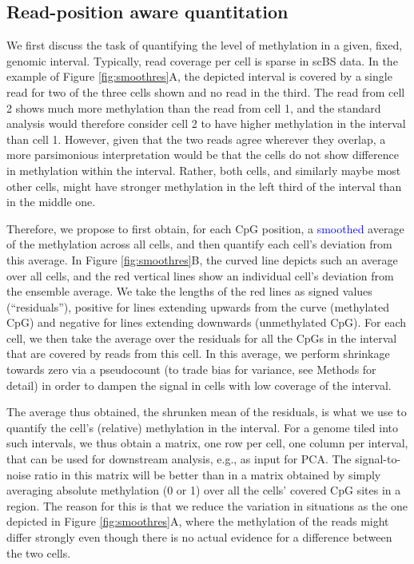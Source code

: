 \documentclass[twocolumn,10pt]{article}
\newcommand{\new}[1]{\textcolor{blue}{#1}}
\begin{document}
\subsection{Read-position aware quantitation} \label{residuals}

We first discuss the task of quantifying the level of methylation in a given, fixed, genomic interval.
Typically, read coverage per cell is sparse in scBS data.
In the example of Figure \ref{fig:smoothres}A, the depicted interval is covered by a single read for two of the three cells shown and no read in the third.
The read from cell 2 shows much more methylation than the read from cell 1, and the standard analysis would therefore consider cell 2 to have higher methylation in the interval than cell 1.
However, given that the two reads agree wherever they overlap, a more parsimonious interpretation would be that the cells do not show difference in methylation within the interval.
Rather, both cells, and similarly maybe most other cells, might have stronger methylation in the left third of the interval than in the middle one.

Therefore, we propose to first obtain, for each CpG position, a \new{smoothed} average of the methylation across all cells, and then quantify each cell's deviation from this average.
In Figure \ref{fig:smoothres}B, the curved line depicts such an average over all cells, and the red vertical lines show an individual cell's deviation from the ensemble average.
We take the lengths of the red lines as signed values (``residuals''), positive for lines extending upwards from the curve (methylated CpG) and negative for lines extending downwards (unmethylated CpG).
For each cell, we then take the average over the residuals for all the CpGs in the interval that are covered by reads from this cell.
In this average, we perform shrinkage towards zero via a pseudocount (to trade bias for variance, see Methods for detail) in order to dampen the signal in cells with low coverage of the interval.

The average thus obtained, the shrunken mean of the residuals, is what we use to quantify the cell's (relative) methylation in the interval.
For a genome tiled into such intervals, we thus obtain a matrix, one row per cell, one column per interval, that can be used for downstream analysis, e.g., as input for PCA.
The signal-to-noise ratio in this matrix will be better than in a matrix obtained by simply averaging absolute methylation (0 or 1) over all the cells' covered CpG sites in a region.
The reason for this is that we reduce the variation in situations as the one depicted in Figure \ref{fig:smoothres}A, where the methylation of the reads might differ strongly even though there is no actual evidence for a difference between the two cells.
\end{document}
